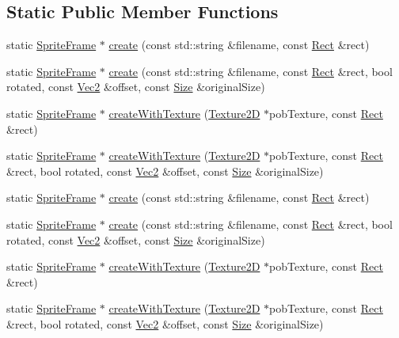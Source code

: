 \subsection*{Static Public Member Functions}
\begin{DoxyCompactItemize}
\item 
static \hyperlink{classSpriteFrame}{Sprite\+Frame} $\ast$ \hyperlink{classSpriteFrame_a33140f4cbd3734f8edf432047ce7db57}{create} (const std\+::string \&filename, const \hyperlink{classRect}{Rect} \&rect)
\item 
static \hyperlink{classSpriteFrame}{Sprite\+Frame} $\ast$ \hyperlink{classSpriteFrame_a7925434f148fa94de3d6d9094371546b}{create} (const std\+::string \&filename, const \hyperlink{classRect}{Rect} \&rect, bool rotated, const \hyperlink{classVec2}{Vec2} \&offset, const \hyperlink{classSize}{Size} \&original\+Size)
\item 
static \hyperlink{classSpriteFrame}{Sprite\+Frame} $\ast$ \hyperlink{classSpriteFrame_aff4175beed9c4b33737a0cad53d6884e}{create\+With\+Texture} (\hyperlink{classTexture2D}{Texture2D} $\ast$pob\+Texture, const \hyperlink{classRect}{Rect} \&rect)
\item 
static \hyperlink{classSpriteFrame}{Sprite\+Frame} $\ast$ \hyperlink{classSpriteFrame_a0f689fde96ad43b838ed4a8ac6759f7a}{create\+With\+Texture} (\hyperlink{classTexture2D}{Texture2D} $\ast$pob\+Texture, const \hyperlink{classRect}{Rect} \&rect, bool rotated, const \hyperlink{classVec2}{Vec2} \&offset, const \hyperlink{classSize}{Size} \&original\+Size)
\item 
static \hyperlink{classSpriteFrame}{Sprite\+Frame} $\ast$ \hyperlink{classSpriteFrame_acfa88af9f8d790e64bc5130f88189a37}{create} (const std\+::string \&filename, const \hyperlink{classRect}{Rect} \&rect)
\item 
static \hyperlink{classSpriteFrame}{Sprite\+Frame} $\ast$ \hyperlink{classSpriteFrame_a9d4bec57fc76c7f77a739725840ca613}{create} (const std\+::string \&filename, const \hyperlink{classRect}{Rect} \&rect, bool rotated, const \hyperlink{classVec2}{Vec2} \&offset, const \hyperlink{classSize}{Size} \&original\+Size)
\item 
static \hyperlink{classSpriteFrame}{Sprite\+Frame} $\ast$ \hyperlink{classSpriteFrame_ab8d6e985de43f7b2cb496cce3f3ba627}{create\+With\+Texture} (\hyperlink{classTexture2D}{Texture2D} $\ast$pob\+Texture, const \hyperlink{classRect}{Rect} \&rect)
\item 
static \hyperlink{classSpriteFrame}{Sprite\+Frame} $\ast$ \hyperlink{classSpriteFrame_a541d520f7a6a26d4f907b2880417a922}{create\+With\+Texture} (\hyperlink{classTexture2D}{Texture2D} $\ast$pob\+Texture, const \hyperlink{classRect}{Rect} \&rect, bool rotated, const \hyperlink{classVec2}{Vec2} \&offset, const \hyperlink{classSize}{Size} \&original\+Size)
\end{DoxyCompactItemize}
